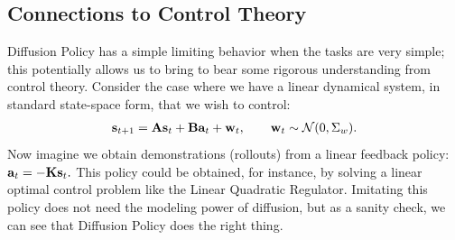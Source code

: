 

\subsection{Connections to Control Theory}
\label{sec:control}
Diffusion Policy has a simple limiting behavior when the tasks are very simple; this potentially allows us to bring to bear some rigorous understanding from control theory. Consider the case where we have a linear dynamical system, in standard state-space form, that we wish to control:
\begin{gather*} 
{\bf s}_{t+1} = {\bf A}{\bf s}_t + {\bf B}{\bf a}_t + {\bf w}_t, \qquad {\bf w}_t \sim \mathcal{N}(0, \Sigma_w).
\end{gather*} Now imagine we obtain demonstrations (rollouts) from a linear feedback policy: ${\bf a}_t = -{\bf K}{\bf s}_t.$ This policy could be obtained, for instance, by solving a linear optimal control problem like the Linear Quadratic Regulator. Imitating this policy does not need the modeling power of diffusion, but as a sanity check, we can see that Diffusion Policy does the right thing.

